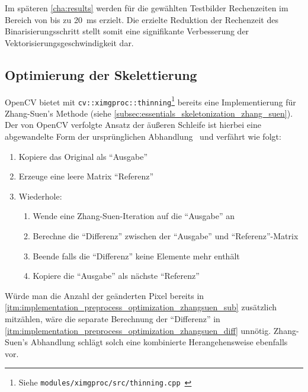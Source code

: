 Im späteren \autoref{cha:results} werden für die gewählten Testbilder Rechenzeiten im Bereich von bis zu \SI{20}{\milli\second} erzielt.
Die erzielte Reduktion der Rechenzeit des Binarisierungsschritt stellt somit eine signifikante Verbesserung der Vektorisierungsgeschwindigkeit dar.

\subsection{Optimierung der Skelettierung}%
\label{subsec:implementation_preprocess_skeletonization_optimization}

OpenCV bietet mit \texttt{cv::ximgproc::thinning}\footnote{Siehe \texttt{modules/ximgproc/src/thinning.cpp}~\cite{opencv_contrib_source}} bereits eine Implementierung für Zhang-Suen's Methode (siehe \autoref{subsec:essentials_skeletonization_zhang_suen}).
Der von OpenCV verfolgte Ansatz der äußeren Schleife ist hierbei eine abgewandelte Form der ursprünglichen Abhandlung~\cite{DBLP:journals/cacm/ZhangS84} und verfährt wie folgt:
\begin{enumerate}
    \item Kopiere das Original als \enquote{Ausgabe}
    \item Erzeuge eine leere Matrix \enquote{Referenz}
    \item Wiederhole:
    \begin{enumerate}[topsep=0pt]
        \item\label{itm:implementation_preprocess_optimization_zhangsuen_sub} Wende eine Zhang-Suen-Iteration auf die \enquote{Ausgabe} an
        \item\label{itm:implementation_preprocess_optimization_zhangsuen_diff} Berechne die \enquote{Differenz} zwischen der \enquote{Ausgabe} und \enquote{Referenz}-Matrix
        \item Beende falls die \enquote{Differenz} keine Elemente mehr enthält
        \item Kopiere die \enquote{Ausgabe} als nächste \enquote{Referenz}
    \end{enumerate}
\end{enumerate}

Würde man die Anzahl der geänderten Pixel bereits in \autoref{itm:implementation_preprocess_optimization_zhangsuen_sub} zusätzlich mitzählen, wäre die separate Berechnung der \enquote{Differenz} in \autoref{itm:implementation_preprocess_optimization_zhangsuen_diff} unnötig.
Zhang-Suen's Abhandlung schlägt solch eine kombinierte Herangehensweise ebenfalls vor.

